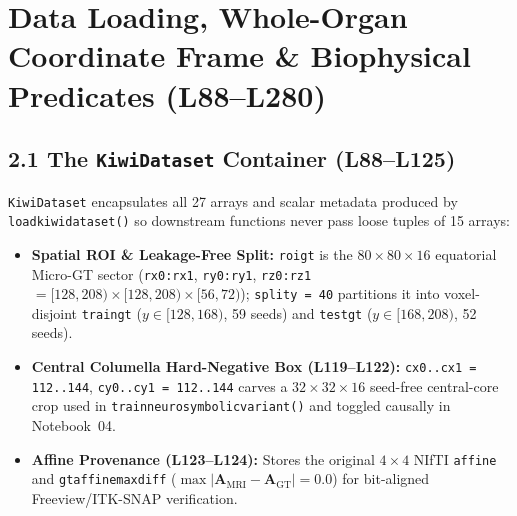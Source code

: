 \documentclass[10pt,a4paper]{article}
\renewcommand{\_}{\origunderscore\allowbreak}
\begin{document}
\section[\texorpdfstring{Data Loading, Whole-Organ Coordinate Frame \& Biophysical Predicates (L88--L280)}{Data Loading, Whole-Organ Coordinate Frame & Biophysical Predicates (L88--L280)}]{Data Loading, Whole-Organ Coordinate Frame \& Biophysical Predicates (L88--L280)}
\subsection*{2.1 The \texttt{KiwiDataset} Container (L88--L125)}
\begin{annotbox}
\texttt{KiwiDataset} encapsulates all 27 arrays and scalar metadata produced by \texttt{load\_kiwi\_dataset()} so downstream functions never pass loose tuples of 15 arrays:
\begin{itemize}
    \item \textbf{Spatial ROI \& Leakage-Free Split:} \texttt{roi\_gt} is the $80 \times 80 \times 16$ equatorial Micro-GT sector (\texttt{rx0:rx1}, \texttt{ry0:ry1}, \texttt{rz0:rz1} $= [128,208)\times[128,208)\times[56,72)$); \texttt{split\_y = 40} partitions it into voxel-disjoint \texttt{train\_gt} ($y \in [128, 168)$, 59 seeds) and \texttt{test\_gt} ($y \in [168, 208)$, 52 seeds).
    \item \textbf{Central Columella Hard-Negative Box (L119--L122):} \texttt{cx0..cx1 = 112..144}, \texttt{cy0..cy1 = 112..144} carves a $32 \times 32 \times 16$ seed-free central-core crop used in \texttt{train\_neurosymbolic\_variant()} and toggled causally in Notebook~04.
    \item \textbf{Affine Provenance (L123--L124):} Stores the original $4 \times 4$ NIfTI \texttt{affine} and \texttt{gt\_affine\_max\_diff} ($\max|\mathbf{A}_{\text{MRI}} - \mathbf{A}_{\text{GT}}| = 0.0$) for bit-aligned Freeview/ITK-SNAP verification.
\end{itemize}
\end{annotbox}
\end{document}
